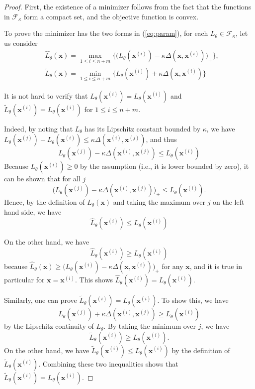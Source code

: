 \documentclass[11pt,fullpage, letterpaper,twoside]{article}
\newcommand{\1}[1]{\mathds{1}_{\left[#1\right]}}
\begin{document}
\begin{proof}
First, the existence of a minimizer follows from the fact that the functions in $\mathcal F_\kappa$ form a compact set, and the objective function is convex.

To prove the minimizer has the two forms in (\ref{eq:param}), for each $L_\theta \in \mathcal F_\kappa$, let us consider
\[
\begin{aligned}
&\widehat L_{\theta}(\mathbf x) = \max_{1\leq i\leq n+m}\big\{\big(L_\theta(\mathbf x^{(i)})-\kappa\Delta(\mathbf x,\mathbf x^{(i)})\big)_+\big\},\\
&\widetilde L_{\theta}(\mathbf x) = \min_{1\leq i\leq n+m}\big\{L_\theta(\mathbf x^{(i)})+\kappa\Delta(\mathbf x,\mathbf x^{(i)})\}
\end{aligned}
\]

It is not hard to verify that $\widehat L_\theta(\mathbf x^{(i)})=L_\theta(\mathbf x^{(i)})$ and $\widetilde L_\theta(\mathbf x^{(i)})=L_\theta(\mathbf x^{(i)})$ for $1\leq i\leq n+m$.

Indeed, by noting that $L_{\theta}$ has its Lipschitz constant bounded by $\kappa$, we have $L_{\theta}(\mathbf x^{(j)})-L_{\theta}(\mathbf x^{(i)})\leq \kappa \Delta(\mathbf x^{(i)},\mathbf x^{(j)})$, and thus
$$L_{\theta}(\mathbf x^{(j)})-\kappa \Delta(\mathbf x^{(i)},\mathbf x^{(j)})\leq L_{\theta}(\mathbf x^{(i)})$$
Because $L_{\theta}(\mathbf x^{(i)})\geq 0$ by the assumption (i.e., it is lower bounded by zero), it can be shown that for all $j$
$$\big(L_{\theta}(\mathbf x^{(j)})-\kappa \Delta(\mathbf x^{(i)},\mathbf x^{(j)})\big)_+\leq L_{\theta}(\mathbf x^{(i)}).$$
Hence, by the definition of $\widehat L_{\theta}(\mathbf x)$ and taking the maximum over $j$ on the left hand side, we have
$$\widehat L_{\theta}(\mathbf x^{(i)})\leq L_{\theta}(\mathbf x^{(i)})$$

On the other hand,  we have
$$\widehat L_{\theta}(\mathbf x^{(i)}) \geq L_{\theta}(\mathbf x^{(i)})$$
because $\widehat L_{\theta}(\mathbf x) \geq \big(L_\theta(\mathbf x^{(i)})-\kappa\Delta(\mathbf x,\mathbf x^{(i)})\big)_+$ for any $\mathbf x$, and it is true in particular for $\mathbf x=\mathbf x^{(i)}$.  This shows $\widehat L_{\theta}(\mathbf x^{(i)}) = L_{\theta}(\mathbf x^{(i)})$.

Similarly, one can prove $\widetilde L_\theta(\mathbf x^{(i)})=L_\theta(\mathbf x^{(i)})$. To show this, we have
$$
L_\theta(\mathbf x^{(j)})+\kappa\Delta(\mathbf x^{(i)},\mathbf x^{(j)})\geq L_\theta(\mathbf x^{(i)})
$$
by the Lipschitz continuity of $L_\theta$. By taking the minimum over $j$, we have
$$
\widetilde L_\theta(\mathbf x^{(i)}) \geq L_\theta(\mathbf x^{(i)}).
$$
On the other hand, we have $\widetilde L_\theta(\mathbf x^{(i)})\leq L_\theta(\mathbf x^{(i)})$ by the definition of $\widetilde L_\theta(\mathbf x^{(i)})$.  Combining these two inequalities shows that $\widetilde L_\theta(\mathbf x^{(i)})=L_\theta(\mathbf x^{(i)})$.


\end{proof}
\end{document}
